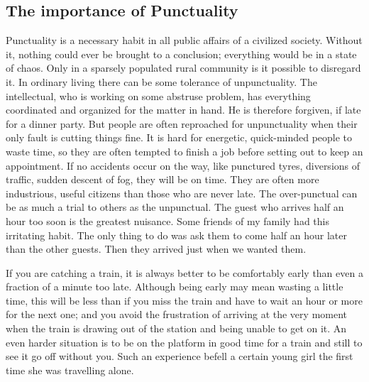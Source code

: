 \documentclass[11pt]{article}
\begin{document}
\subsection{The importance of Punctuality}
\label{sec-1-60}

Punctuality is a necessary habit in all public affairs of a civilized society. Without it, nothing could ever be brought to a conclusion; everything would be in a state of chaos. Only in a sparsely populated rural community is it possible to disregard it. In ordinary living there can be some tolerance of unpunctuality. The intellectual, who is working on some abstruse problem, has everything coordinated and organized for the matter in hand. He is therefore forgiven, if late for a dinner party. But people are often reproached for unpunctuality when their only fault is cutting things fine. It is hard for energetic, quick-minded people to waste time, so they are often tempted to finish a job before setting out to keep an appointment. If no accidents occur on the way, like punctured tyres, diversions of traffic, sudden descent of fog, they will be on time. They are often more industrious, useful citizens than those who are never late. The over-punctual can be as much a trial to others as the unpunctual. The guest who arrives half an hour too soon is the greatest nuisance. Some friends of my family had this irritating habit. The only thing to do was ask them to come half an hour later than the other guests. Then they arrived just when we wanted them. 

If you are catching a train, it is always better to be comfortably early than even a fraction of a minute too late. Although being early may mean wasting a little time, this will be less than if you miss the train and have to wait an hour or more for the next one; and you avoid the frustration of arriving at the very moment when the train is drawing out of the station and being unable to get on it. An even harder situation is to be on the platform in good time for a train and still to see it go off without you. Such an experience befell a certain young girl the first time she was travelling alone.
\end{document}
